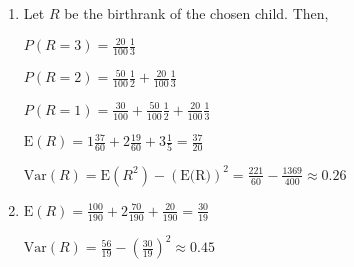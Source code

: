 \begin{enumerate}[label=(\alph*)]
\item Let $R$ be the birthrank of the chosen child. Then,

$P(R=3) = \frac{20}{100}\frac{1}{3}$

$P(R=2) = \frac{50}{100}\frac{1}{2} + \frac{20}{100}\frac{1}{3}$

$P(R=1) = \frac{30}{100} + \frac{50}{100}\frac{1}{2} + \frac{20}{100}\frac{1}{3}$

$\text{E}(R) = 1\frac{37}{60} + 2\frac{19}{60} + 3\frac{1}{5} = \frac{37}{20}$

$\text{Var}(R) = \text{E}(R^{2}) - (\text{E(R)})^{2} = \frac{221}{60} - 
\frac{1369}{400} \approx 0.26$

\item 
$\text{E}(R) = \frac{100}{190} + 2\frac{70}{190} + \frac{20}{190} = \frac{30}
{19}$

$\text{Var}(R) = \frac{56}{19} - (\frac{30}{19})^{2} \approx 0.45$
\end{enumerate}